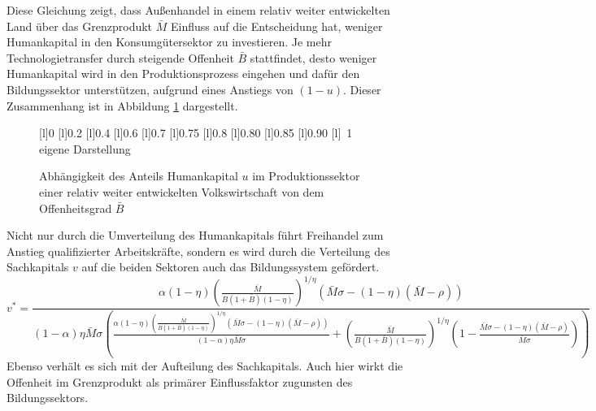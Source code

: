 %
Diese Gleichung zeigt, dass Außenhandel in einem relativ weiter entwickelten Land über das Grenzprodukt $\bar{M}$ Einfluss auf die Entscheidung hat, weniger Humankapital in den Konsumgütersektor zu investieren. Je mehr Technologietransfer durch steigende Offenheit $\bar{B}$ stattfindet, desto weniger Humankapital wird in den Produktionsprozess eingehen und dafür den Bildungssektor unterstützen, aufgrund eines Anstiegs von $(1-u)$. Dieser Zusammenhang ist in Abbildung \ref{fig:VeränderungHumankapitalOffenheit} dargestellt.  \\
%
\begin{figure}[htb!] 
\vspace{0.13cm}
 \centering 
		[l]{\footnotesize{0}}
		[l]{\footnotesize{0.2}}
		[l]{\footnotesize{0.4}}
		[l]{\footnotesize{0.6}}
		[l]{\footnotesize{0.7}}
		[l]{\footnotesize{0.75}}
		[l]{\footnotesize{0.8}}
		[l]{\footnotesize{0.80}}
		[l]{\footnotesize{0.85}}
		[l]{\footnotesize{0.90}}
		[l]{~\footnotesize{1}}
	\hfill{}  eigene Darstellung
	\caption{Abhängigkeit des Anteils Humankapital $u$ im Produktionssektor einer relativ weiter entwickelten Volkswirtschaft von dem Offenheitsgrad $\bar{B}$}
	\label{fig:VeränderungHumankapitalOffenheit}
\end{figure}
%
Nicht nur durch die Umverteilung des Humankapitals führt Freihandel zum Anstieg qualifizierter Arbeitskräfte, sondern es wird durch die Verteilung des Sachkapitals $v$ auf die beiden Sektoren auch das Bildungssystem gefördert. 
%
\begin{equation}
	\boxed{
	v^*=\frac{\alpha  (1-\eta ) \left(\frac{\bar{M}}{B (1+\bar{B}) (1-\eta )}\right)^{1/\eta } (\bar{M} \sigma -(1-\eta ) (\bar{M}-\rho ))}{(1-\alpha ) \eta  \bar{M} \sigma  \left(\frac{\alpha  (1-\eta ) \left(\frac{\bar{M}}{B (1+\bar{B}) (1-\eta )}\right)^{1/\eta } (\bar{M} \sigma -(1-\eta ) (\bar{M}-\rho ))}{(1-\alpha ) \eta  \bar{M} \sigma }+\left(\frac{\bar{M}}{B (1+\bar{B}) (1-\eta )}\right)^{1/\eta } \left(1-\frac{\bar{M} \sigma -(1-\eta ) (\bar{M}-\rho )}{\bar{M} \sigma }\right)\right)}
	}
\end{equation}
%
Ebenso verhält es sich mit der Aufteilung des Sachkapitals. Auch hier wirkt die Offenheit im Grenzprodukt als primärer Einflussfaktor zugunsten des Bildungssektors.\\
